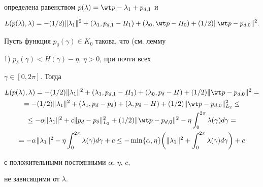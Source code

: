 \begin{pf}
\begin{equation}
\end{equation}


определена равенством $p(\lambda)=\wt p-\lambda_{1}+p_{d,1}$ и


$$


L(p(\lambda),\lambda)=-(1/2)\|\lambda_{1}\|^2+(\lambda_{1},p_{d,1}


-H_{1})+


(\lambda_{0},\wt p-H_{0})+(1/2)\| \wt p-p_{d,0}\|^{2}.


$$


Пусть функция $p_{\delta}(\gamma)\in K_{0}$ такова, что (см. лемму


1) $p_{\delta}(\gamma)<H(\gamma)-\eta$, $\eta>0$, при почти всех


$\gamma \in [0,2\pi]$. Тогда


\begin{gather}


L(p(\lambda),\lambda)=-(1/2)\|\lambda_{1}\|^{2}+


(\lambda_{1},p_{d,1}-H_{1})+(\lambda_{0},p_{\delta}-H)+(1/2)\|


\wt p-p_{d,0}\|^{2}= \notag \\


%


=-(1/2)\|\lambda_{1}\|^{2}+


(\lambda_{1},p_{d}-p_{\delta})+(\lambda,p_{\delta}-H)+(1/2)\|


\wt p-p_{d,0}\|_{L_{2}}^{2}\leq\notag \\


%


\leq -\alpha \|\lambda_{1}\|^{2}+c\|


p_{d}-p_{\delta}\|_{L_{2}}^{2}+(1/2)\| \wt


p-p_{d,0}\|^{2}-\eta \int_{0}^{2\pi}\lambda(\gamma)d\gamma=\notag \\


%


\label{dual}


=-\alpha\|\lambda_{1}\|^{2}-\eta


\int_{0}^{2\pi}\lambda(\gamma)d\gamma+c\leq -\min\{\alpha,\eta


\}\bigg(\|\lambda_{1}\|^{2}+\int_{0}^{2\pi}\lambda(\gamma)d\gamma\bigg)+c


\end{gather}


с положительными постоянными $\alpha$, $\eta$, $c$,


не зависящими от $\lambda$.






\end{pf}
